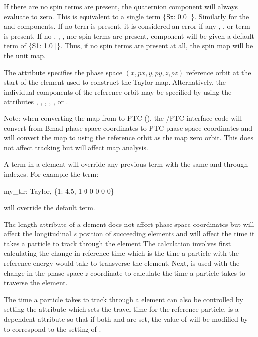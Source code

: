 {If there are no  spin terms are present, the  quaternion component will always
evaluate to zero.  This is equivalent to a single term \{Sx: 0.0 |\}.  Similarly for the  and
 components. If no  term is present, it is considered an error if any ,
, or  term is present. If no , , , nor  spin terms are
present,  component will be given a default term of \{S1: 1.0 |\}. Thus, if no spin terms are
present at all, the spin map will be the unit map.

The  attribute specifies the phase space $(x, px, y, py, z, pz)$ reference
orbit at the start of the element used to construct the Taylor map. Alternatively, the
individual components of the reference orbit may be specified by using the attributes 
, , , , , or .

Note: when converting the map from \bmad to PTC (), the \bmad/PTC interface
code will convert from Bmad phase space coordinates to PTC phase space coordinates and
will convert the map to using the reference orbit as the map zero orbit. This does not
affect tracking but will affect map analysis.

A term in a  element will override any previous term
with the same  and  through  indexes. For example the term:
\begin{example}
  my_tlr: Taylor, \{1: 4.5, 1 0 0 0 0 0\} 
\end{example}
will override the default  term.

The  length attribute of a  element does not affect phase space coordinates but
will affect the longitudinal $s$ position of succeeding elements and will affect the time it takes a
particle to track through the element The calculation involves first calculating the change in
reference time which is the time a particle with the reference energy would take to transverse the
element. Next,  is used with the change in the phase space $z$ coordinate to calculate
the time a particle takes to traverse the element.

The time a particle takes to track through a  element can also be controlled by setting
the  attribute which sets the travel time for the reference
particle.  is a dependent attribute so that if both  and
 are set, the value of  will be modified by \bmad to
correspond to the setting of .

}
